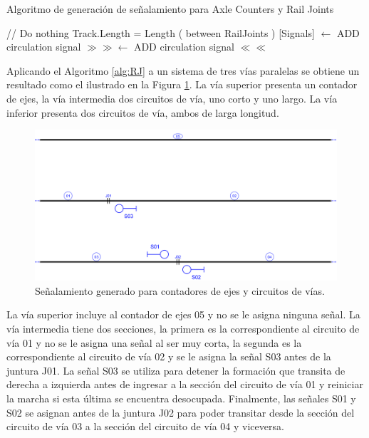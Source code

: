     \begin{algorithm}[hbt!]
        \caption{Algoritmo de generación de señalamiento para Axle Counters y Rail Joints}\label{alg:RJ}
        \DontPrintSemicolon
        \SetNoFillComment
        \LinesNotNumbered 
        {
            // Do nothing
        }
        {
            Track.Length = Length ( between RailJoints )\;
            {
                [Signals] $\gets$ ADD circulation signal $\gg\gg$\;
                [Signals] $\gets$ ADD circulation signal $\ll\ll$\;
            }
        }
        \KwResult{[Signals]} 
    \end{algorithm} 

    Aplicando el Algoritmo \ref{alg:RJ} a un sistema de tres vías paralelas se obtiene un resultado como el ilustrado en la Figura \ref{fig:signal_detector}. La vía superior presenta un contador de ejes, la vía intermedia dos circuitos de vía, uno corto y uno largo. La vía inferior presenta dos circuitos de vía, ambos de larga longitud.
    
    \begin{figure}[h!]
        \centering
        \includegraphics[width=1\textwidth]{Figuras/detectores.PNG}
        \centering\caption{Señalamiento generado para contadores de ejes y circuitos de vías.}
        \label{fig:signal_detector}
    \end{figure}

    La vía superior incluye al contador de ejes 05 y no se le asigna ninguna señal. La vía intermedia tiene dos secciones, la primera es la correspondiente al circuito de vía 01 y no se le asigna una señal al ser muy corta, la segunda es la correspondiente al circuito de vía 02 y se le asigna la señal S03 antes de la juntura J01. La señal S03 se utiliza para detener la formación que transita de derecha a izquierda antes de ingresar a la sección del circuito de vía 01 y reiniciar la marcha si esta última se encuentra desocupada. Finalmente, las señales S01 y S02 se asignan antes de la juntura J02 para poder transitar desde la sección del circuito de vía 03 a la sección del circuito de vía 04 y viceversa.